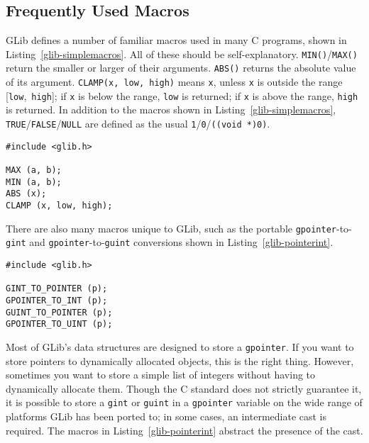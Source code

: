 \subsection{Frequently Used Macros}

GLib defines a number of familiar macros used in many C programs, shown in Listing~\ref{glib-simplemacros}. All of these should be self-explanatory. \lstinline{MIN()}/\lstinline{MAX()} return the smaller or larger of their arguments. \lstinline{ABS()} returns the absolute value of its argument. \lstinline{CLAMP(x, low, high)} means \lstinline{x}, unless \lstinline{x} is outside the range [\lstinline{low},~\lstinline{high}]; if \lstinline{x} is below the range, \lstinline{low} is returned; if \lstinline{x} is above the range, \lstinline{high} is returned. In addition to the macros shown in Listing~\ref{glib-simplemacros}, \lstinline{TRUE}/\lstinline{FALSE}/\lstinline{NULL} are defined as the usual \lstinline{1}/\lstinline{0}/\lstinline{((void *)0)}.

\begin{lstlisting}[float, caption={Familiar C Macros}, label=glib-simplemacros]
#include <glib.h>

MAX (a, b);
MIN (a, b);
ABS (x);
CLAMP (x, low, high);
\end{lstlisting}

There are also many macros unique to GLib, such as the portable \lstinline{gpointer}-to-\lstinline{gint} and \lstinline{gpointer}-to-\lstinline{guint} conversions shown in Listing~\ref{glib-pointerint}.

\begin{lstlisting}[float, caption={Macros for storing integers in pointers}, label=glib-pointerint]
#include <glib.h>

GINT_TO_POINTER (p);
GPOINTER_TO_INT (p);
GUINT_TO_POINTER (p);
GPOINTER_TO_UINT (p);
\end{lstlisting}

Most of GLib's data structures are designed to store a \lstinline{gpointer}. If you want to store pointers to dynamically allocated objects, this is the right thing. However, sometimes you want to store a simple list of integers without having to dynamically allocate them. Though the C standard does not strictly guarantee it, it is possible to store a \lstinline{gint} or \lstinline{guint} in a \lstinline{gpointer} variable on the wide range of platforms GLib has been ported to; in some cases, an intermediate cast is required. The macros in Listing~\ref{glib-pointerint} abstract the presence of the cast.

